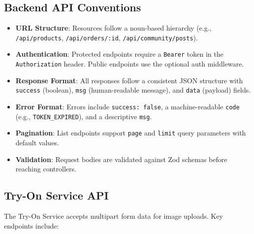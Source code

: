 \subsection{Backend API Conventions}
\begin{itemize}[leftmargin=*]
    \item \textbf{URL Structure}: Resources follow a noun-based hierarchy (e.g., \texttt{/api/products}, \texttt{/api/orders/:id}, \texttt{/api/community/posts}).
    \item \textbf{Authentication}: Protected endpoints require a \texttt{Bearer} token in the \texttt{Authorization} header. Public endpoints use the optional auth middleware.
    \item \textbf{Response Format}: All responses follow a consistent JSON structure with \texttt{success} (boolean), \texttt{msg} (human-readable message), and \texttt{data} (payload) fields.
    \item \textbf{Error Format}: Errors include \texttt{success: false}, a machine-readable \texttt{code} (e.g., \texttt{TOKEN\_EXPIRED}), and a descriptive \texttt{msg}.
    \item \textbf{Pagination}: List endpoints support \texttt{page} and \texttt{limit} query parameters with default values.
    \item \textbf{Validation}: Request bodies are validated against Zod schemas before reaching controllers.
\end{itemize}

\subsection{Try-On Service API}
The Try-On Service accepts multipart form data for image uploads. Key endpoints include:

